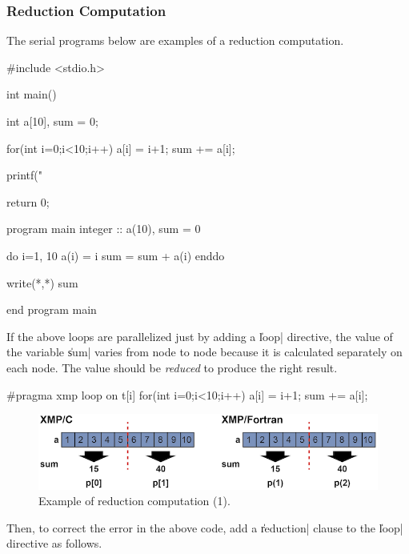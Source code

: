 \subsubsection{Reduction Computation}

The serial programs below are examples of a reduction computation.

\begin{Cexample}
#include <stdio.h>

int main(){
  int a[10], sum = 0;

  for(int i=0;i<10;i++){
    a[i] = i+1;
    sum += a[i];
  }

  printf("%

  return 0;
}
\end{Cexample}

\begin{Fexample}
program main
  integer :: a(10), sum = 0

  do i=1, 10
    a(i) = i
    sum = sum + a(i)
  enddo

  write(*,*) sum

end program main
\end{Fexample}

If the above loops are parallelized just by adding a \|loop| directive, the
value of the variable \|sum| varies from node to node because it is
calculated separately on each node. The value should be {\it reduced}
to produce the right result.

\begin{XCexample}
#pragma xmp loop on t[i]
   for(int i=0;i<10;i++){
     a[i] = i+1;
     sum += a[i];
   }
\end{XCexample}


\begin{figure}
  \centering
  \includegraphics[width=\textwidth]{figs/reduction1.png}
  \caption{Example of reduction computation (1).}
\end{figure}

Then, to correct the error in the above code, add a \|reduction| clause
to the \|loop| directive as follows.


